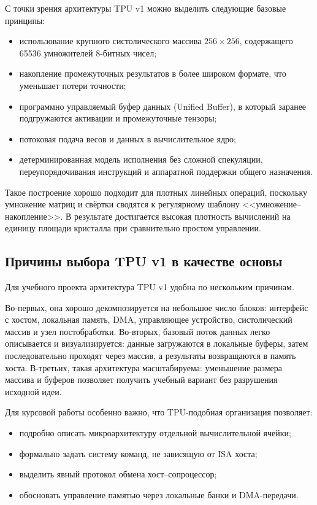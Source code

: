 \documentclass[12pt,a4paper]{article}
\begin{document}
С точки зрения архитектуры TPU v1 можно выделить следующие базовые принципы:
\begin{itemize}
    \item использование крупного систолического массива \(256 \times 256\), содержащего 65536 умножителей 8-битных чисел;
    \item накопление промежуточных результатов в более широком формате, что уменьшает потери точности;
    \item программно управляемый буфер данных (Unified Buffer), в который заранее подгружаются активации и промежуточные тензоры;
    \item потоковая подача весов и данных в вычислительное ядро;
    \item детерминированная модель исполнения без сложной спекуляции, переупорядочивания инструкций и аппаратной поддержки общего назначения.
\end{itemize}

Такое построение хорошо подходит для плотных линейных операций, поскольку умножение матриц и свёртки сводятся к регулярному шаблону <<умножение--накопление>>. В результате достигается высокая плотность вычислений на единицу площади кристалла при сравнительно простом управлении.

\subsection{Причины выбора TPU v1 в качестве основы}

Для учебного проекта архитектура TPU v1 удобна по нескольким причинам.

Во-первых, она хорошо декомпозируется на небольшое число блоков: интерфейс с хостом, локальная память, DMA, управляющее устройство, систолический массив и узел постобработки. Во-вторых, базовый поток данных легко описывается и визуализируется: данные загружаются в локальные буферы, затем последовательно проходят через массив, а результаты возвращаются в память хоста. В-третьих, такая архитектура масштабируема: уменьшение размера массива и буферов позволяет получить учебный вариант без разрушения исходной идеи.

Для курсовой работы особенно важно, что TPU-подобная организация позволяет:
\begin{itemize}
    \item подробно описать микроархитектуру отдельной вычислительной ячейки;
    \item формально задать систему команд, не зависящую от ISA хоста;
    \item выделить явный протокол обмена хост--сопроцессор;
    \item обосновать управление памятью через локальные банки и DMA-передачи.
\end{itemize}
\end{document}
